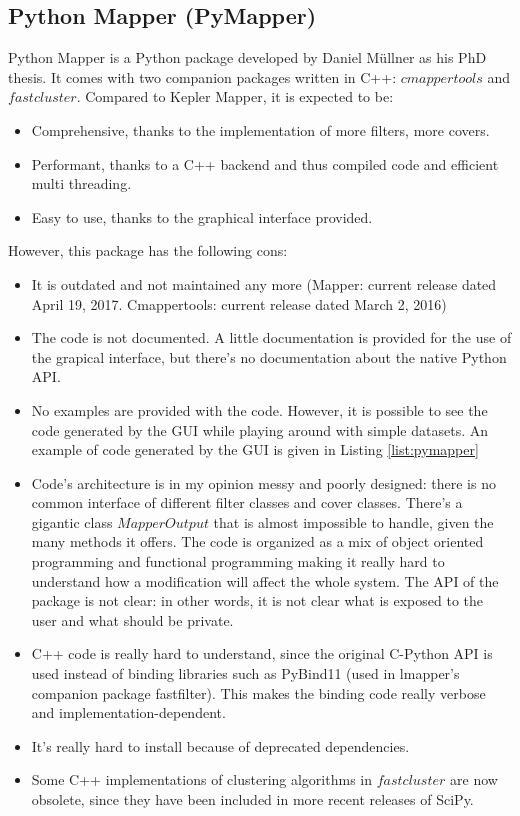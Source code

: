 \subsection{Python Mapper (PyMapper)}
Python Mapper is a Python package developed by Daniel M\"ullner as his PhD thesis. It comes with two companion packages written in C++: $cmappertools$ and $fastcluster$. Compared to Kepler Mapper, it is expected to be:
\begin{itemize}
	\item Comprehensive, thanks to the implementation of more filters, more covers.
	\item Performant, thanks to a C++ backend and thus compiled code and efficient multi threading.
	\item Easy to use, thanks to the graphical interface provided.
\end{itemize}

However, this package has the following cons:
\begin{itemize}
\item It is outdated and not maintained any more (Mapper: current release dated April 19, 2017. Cmappertools: current release dated March 2, 2016)
\item The code is not documented. A little documentation is provided for the use of the grapical interface, but there's no documentation about the native Python API.
\item No examples are provided with the code. However, it is possible to see the code generated by the GUI while playing around with simple datasets. An example of code generated by the GUI is given in Listing \ref{list:pymapper}
\item Code's architecture is in my opinion messy and poorly designed: there is no common interface of different filter classes and cover classes. There's a gigantic class $MapperOutput$ that is almost impossible to handle, given the many methods it offers. The code is organized as a mix of object oriented programming and functional programming making it really hard to understand how a modification will affect the whole system. The API of the package is not clear: in other words, it is not clear what is exposed to the user and what should be private.
\item C++ code is really hard to understand, since the original C-Python API is used instead of binding libraries such as PyBind11 (used in lmapper's companion package fastfilter). This makes the binding code really verbose and implementation-dependent.
\item It's really hard to install because of deprecated dependencies.
\item Some C++ implementations of clustering algorithms in $fastcluster$ are now obsolete, since they have been included in more recent releases of SciPy.
\end{itemize}

